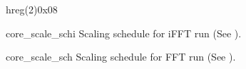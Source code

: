 \documentclass[11pt,technote,a4paper,onecolumn,dvips]{IEEEtran}
\begin{document}
\begin{register}{h}{reg(2)}{0x08}%
    \label{reg2}%
    \regnewline%
    \begin{regdesc}\begin{reglist}
        \item[core\_scale\_schi] Scaling schedule for iFFT run (See
            \cite[p. 24]{xilinx_fft}).
        \item[core\_scale\_sch] Scaling schedule for FFT run (See
            \cite[p. 24]{xilinx_fft}).
    \end{reglist}\end{regdesc}
\end{register}
\end{document}
